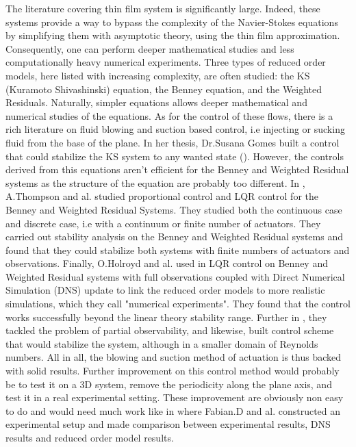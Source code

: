 \documentclass[12pt]{article}
\begin{document}
The literature covering thin film system is significantly large. Indeed, these systems provide a way to bypass the complexity of the Navier-Stokes equations by simplifying them with asymptotic theory, using the thin film approximation. Consequently, one can perform deeper mathematical studies and less computationally heavy numerical experiments. Three types of reduced order models, here listed with increasing complexity, are often studied: the KS (Kuramoto Shivashinski) equation, the Benney equation, and the Weighted Residuals. Naturally, simpler equations allows deeper mathematical and numerical studies of the equations. As for the control of these flows, there is a rich literature on fluid blowing and suction based control, i.e injecting or sucking fluid from the base of the plane. In her thesis, Dr.Susana Gomes built a control that could stabilize the KS system to any wanted state (\cite{Susana_thesis}). However, the controls derived from this equations aren't efficient for the Benney and Weighted Residual systems as the structure of the equation are probably too different. In \cite{Thompson_2016_prop_ctrl}, A.Thompson and al. studied proportional control and LQR control for the Benney and Weighted Residual Systems. They studied both the continuous case and discrete case, i.e with a continuum or finite number of actuators. They carried out stability analysis on the Benney and Weighted Residual systems and found that they could stabilize both systems with finite numbers of actuators and observations. Finally, O.Holroyd and al. used in \cite{holroyd2023linearquadraticregulationcontrol} LQR control on Benney and Weighted Residual systems with full observations coupled with Direct Numerical Simulation (DNS) update to link the reduced order models to more realistic simulations, which they call "numerical experiments". They found that the control works successfully beyond the linear theory stability range. Further in \cite{holroyd2024stabilisationfallingliquidfilms}, they tackled the problem of partial observability, and likewise, 
built control scheme that would stabilize the system, although in a smaller domain of Reynolds numbers. All in all, the blowing and suction method of actuation is thus backed with solid results. Further improvement on this control method would probably be to test it on a 3D system, remove the periodicity along the plane axis, and test it in a real experimental setting. These improvement are obviously non easy to do and would need much work like in \cite{Experimental_DNS_Reduced_order_modelling_paper} where Fabian.D and al. constructed an experimental setup and made comparison between experimental results, DNS results and reduced order model results. 
\\
\end{document}
